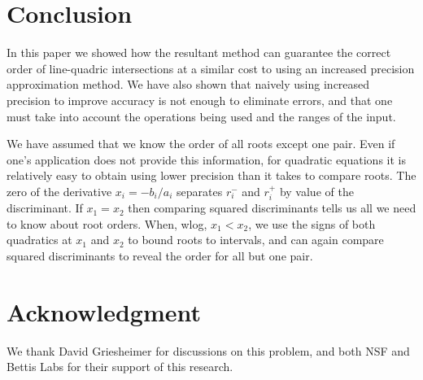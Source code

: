 \documentclass{cccg16}
\begin{document}
\section{Conclusion}
In this paper we showed how the resultant method can guarantee the
correct order of line-quadric intersections at a similar cost to using
an increased precision approximation method.  We have also shown that
naively using increased precision to improve accuracy is not enough to
eliminate errors, and that one must take into account the operations
being used and the ranges of the input.

We have assumed that we know the order of all roots except one
pair. Even if one's application does not provide this information, for
quadratic equations it is relatively easy to obtain using lower
precision than it takes to compare roots.  The zero of the derivative
$x_i=-b_i/a_i$ separates $r_i^-$ and $r_i^+$ by value of the
discriminant.  If $x_1=x_2$ then comparing squared discriminants tells
us all we need to know about root orders.  When, wlog, $x_1<x_2$, we
use the signs of both quadratics at $x_1$ and $x_2$ to bound roots to
intervals, and can again compare squared discriminants to reveal the
order for all but one pair.

\section{Acknowledgment}
We thank David Griesheimer for discussions on this problem, and both
NSF and Bettis Labs for their support of this research.

\printbibliography
\end{document}
